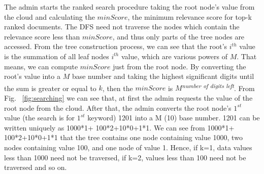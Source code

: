 \documentclass[sigconf,pdftex]{acmart}
\begin{document}








The admin starts the ranked search procedure taking the root node's value from the cloud and calculating the $minScore$, the minimum relevance score for top-k ranked documents. The DFS need not traverse the nodes which contain the relevance score less than $minScore$, and thus only parts of the tree nodes are accessed. From the tree construction process, we can see that the root's $i^{th}$ value is the summation of all leaf nodes $i^{th}$ value, which are various powers of $M$. That means, we can compute $minScore$ just from the root node. By converting the root's value into a $M$ base number and taking the highest significant digits until the sum is greater or equal to $k$, then the $minScore$ is $M$\textsuperscript{\textit{number of digits left}}. From Fig. ~\ref{fig:searching} we can see that, at first the admin requests the value of the root node from the cloud. After that, the admin converts the root node's $1^{st}$ value (the search is for $1^{st}$ keyword) 1201 into a M (10) base number. 1201 can be written uniquely as 1000*1+ 100*2+10*0+1*1. We can see from 1000*1+ 100*2+10*0+1*1 that the tree contains one node containing value 1000, two nodes containing value 100, and one node of value 1. Hence, if k=1, data values less than 1000 need not be traversed, if k=2, values less than 100 need not be traversed and so on.
\end{document}
